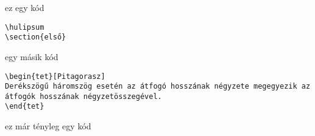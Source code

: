\documentclass{article}
\newtheorem{tet}{Tétel}
\begin{document}
\begin{forraskod}
\caption{ez egy kód}
\begin{verbatim}
\hulipsum
\section{első}
\end{verbatim}
\end{forraskod}

\hulipsum[3]

\begin{forraskod}
\caption{egy másik kód}
\begin{verbatim}
\begin{tet}[Pitagorasz]
Derékszögű háromszög esetén az átfogó hosszának négyzete megegyezik az átfogók hosszának négyzetösszegével.
\end{tet}
\end{verbatim}
\end{forraskod}

\begin{kod}
\caption{ez már tényleg egy kód}

\end{kod}
\end{document}
